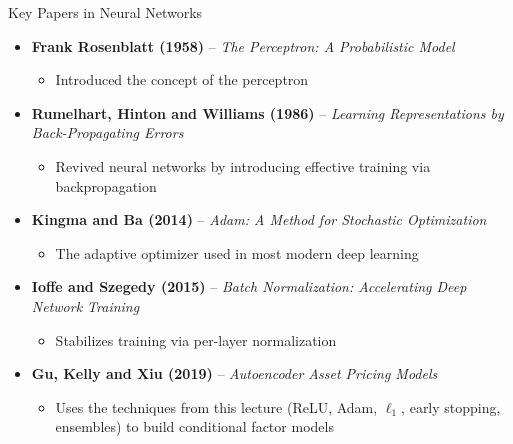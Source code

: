 \documentclass[aspectratio=169]{beamer}
\begin{document}
\begin{frame}{Key Papers in Neural Networks}

\begin{itemize}
    \item \textbf{Frank Rosenblatt (1958)} -- \textit{The Perceptron: A Probabilistic Model}  
    \begin{itemize}
        \item Introduced the concept of the perceptron
    \end{itemize}

    \item \textbf{Rumelhart, Hinton and Williams (1986)} -- \textit{Learning Representations by Back-Propagating Errors}  
    \begin{itemize}
        \item Revived neural networks by introducing effective training via backpropagation
    \end{itemize}

    \item \textbf{Kingma and Ba (2014)} -- \textit{Adam: A Method for Stochastic Optimization}
    \begin{itemize}
        \item The adaptive optimizer used in most modern deep learning
    \end{itemize}

    \item \textbf{Ioffe and Szegedy (2015)} -- \textit{Batch Normalization: Accelerating Deep Network Training}
    \begin{itemize}
        \item Stabilizes training via per-layer normalization
    \end{itemize}

    \item \textbf{Gu, Kelly and Xiu (2019)} -- \textit{Autoencoder Asset Pricing Models}
    \begin{itemize}
        \item Uses the techniques from this lecture (ReLU, Adam, $\ell_1$, early stopping, ensembles) to build conditional factor models
    \end{itemize}
\end{itemize}

\end{frame}
%
%
\end{document}
